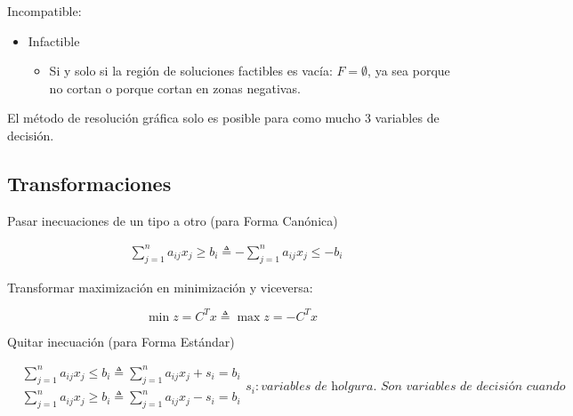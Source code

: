 \documentclass[12pt, twoside, openright]{report} %
\begin{document}
	Incompatible: 
	\begin{itemize}
		\item Infactible 
		\begin{itemize}
			\item Si y solo si la región de soluciones
			factibles es vacía: \(F=\emptyset\), ya sea porque no cortan o
			porque cortan en zonas negativas.
			\begin{figure}[H]
				{}
			\end{figure}
		\end{itemize}

	\end{itemize}

	
	
  El método de resolución gráfica solo es posible para como mucho 3
  variables de decisión.
\pagebreak
  \subsection{Transformaciones}

  
  Pasar inecuaciones de un tipo a otro (para Forma Canónica)

  $$\begin{aligned}  &\sum\limits_{j=1}^{n} a_{i j} x_{j} \geqslant b_{i} \triangleq -\sum\limits_{j=1}^{n} a_{i j} x_{j}\leq -b_{i}  \end{aligned}$$

	Transformar maximización en minimización y viceversa:

	
	$$\min z = C^{T}x \triangleq \max z =- C^{T}x$$

  Quitar inecuación (para Forma Estándar)

  $$\begin{aligned}  &\sum\limits_{j=1}^{n} a_{i j} x_{j} \leqslant b_{i} \triangleq \sum\limits_{j=1}^{n} a_{i j} x_{j}+s_{i}=b_{i}\\  &\sum\limits_{j=1}^{n} a_{i j} x_{j} \geqslant b_{i} \triangleq \sum\limits_{j=1}^{n} a_{i j} x_{j}-s_{i}=b_{i}  \end{aligned}s_i: \textit{variables de holgura. Son variables de decisión cuando}$$
  
\end{document}
